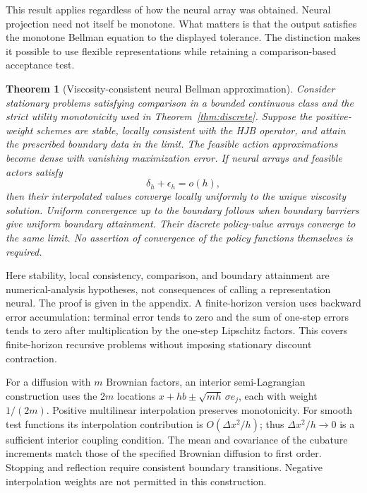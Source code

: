 \documentclass[ecta,draft]{econsocart}
\newtheorem{theorem}{Theorem}
\theoremstyle{definition}
\theoremstyle{remark}
\begin{document}
This result applies regardless of how the neural array was obtained. Neural projection need not itself be monotone. What matters is that the output satisfies the monotone Bellman equation to the displayed tolerance. The distinction makes it possible to use flexible representations while retaining a comparison-based acceptance test.

\begin{theorem}[Viscosity-consistent neural Bellman approximation]\label{thm:viscosity}
Consider stationary problems satisfying comparison in a bounded continuous class and the strict utility monotonicity used in Theorem~\ref{thm:discrete}. Suppose the positive-weight schemes are stable, locally consistent with the HJB operator, and attain the prescribed boundary data in the limit. The feasible action approximations become dense with vanishing maximization error. If neural arrays and feasible actors satisfy
\begin{equation}\label{eq:scalederror}
 \delta_h+\epsilon_h=o(h),
\end{equation}
then their interpolated values converge locally uniformly to the unique viscosity solution. Uniform convergence up to the boundary follows when boundary barriers give uniform boundary attainment. Their discrete policy-value arrays converge to the same limit. No assertion of convergence of the policy functions themselves is required.
\end{theorem}

Here stability, local consistency, comparison, and boundary attainment are numerical-analysis hypotheses, not consequences of calling a representation neural. The proof is given in the appendix. A finite-horizon version uses backward error accumulation: terminal error tends to zero and the sum of one-step errors tends to zero after multiplication by the one-step Lipschitz factors. This covers finite-horizon recursive problems without imposing stationary discount contraction.

For a diffusion with $m$ Brownian factors, an interior semi-Lagrangian construction uses the $2m$ locations $x+h b\pm\sqrt{mh}\,\sigma e_j$, each with weight $1/(2m)$. Positive multilinear interpolation preserves monotonicity. For smooth test functions its interpolation contribution is $O(\Delta x^2/h)$; thus $\Delta x^2/h\to0$ is a sufficient interior coupling condition. The mean and covariance of the cubature increments match those of the specified Brownian diffusion to first order. Stopping and reflection require consistent boundary transitions. Negative interpolation weights are not permitted in this construction.
\end{document}
